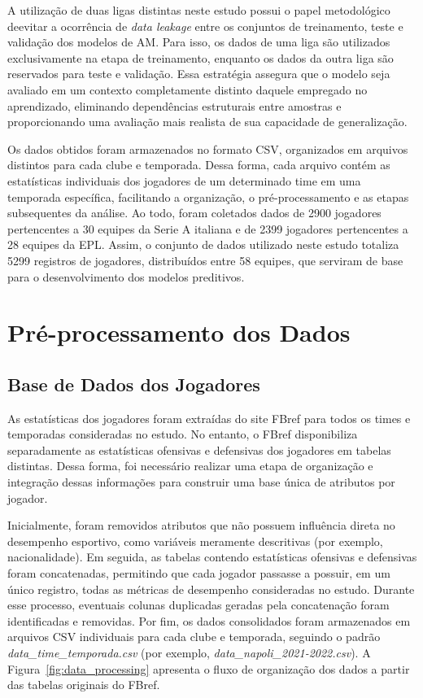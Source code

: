 A utilização de duas ligas distintas neste estudo possui o papel metodológico deevitar a ocorrência de \textit{data leakage} entre os conjuntos de 
treinamento, teste e validação dos modelos de AM. Para isso, os dados de uma liga são utilizados exclusivamente na etapa de treinamento, enquanto os 
dados da outra liga são reservados para teste e validação. Essa estratégia assegura que o modelo seja avaliado em um contexto completamente distinto daquele empregado no 
aprendizado, eliminando dependências estruturais entre amostras e proporcionando uma avaliação mais realista de sua capacidade de generalização.

Os dados obtidos foram armazenados no formato CSV, organizados em arquivos distintos para cada clube e temporada. Dessa forma, cada arquivo contém as estatísticas 
individuais dos jogadores de um determinado time em uma temporada específica, facilitando a organização, o pré-processamento e as etapas subsequentes da análise. 
Ao todo, foram coletados dados de 2900 jogadores pertencentes a 30 equipes da Serie A italiana e de 2399 jogadores pertencentes a 28 equipes da 
EPL. Assim, o conjunto de dados utilizado neste estudo totaliza 5299 registros de jogadores, distribuídos entre 58 equipes, 
que serviram de base para o desenvolvimento dos modelos preditivos.

\section{Pré-processamento dos Dados}

\subsection{Base de Dados dos Jogadores}

As estatísticas dos jogadores foram extraídas do site FBref \cite{fbref} para todos os times e temporadas consideradas no estudo. No entanto, 
o FBref disponibiliza separadamente as estatísticas ofensivas e defensivas dos jogadores em tabelas distintas. Dessa forma, foi necessário realizar uma etapa 
de organização e integração dessas informações para construir uma base única de atributos por jogador.

Inicialmente, foram removidos atributos que não possuem influência direta no desempenho esportivo, como variáveis meramente descritivas (por exemplo, nacionalidade). 
Em seguida, as tabelas contendo estatísticas ofensivas e defensivas foram concatenadas, permitindo que cada jogador passasse a possuir, em um único registro, todas 
as métricas de desempenho consideradas no estudo. Durante esse processo, eventuais colunas duplicadas geradas pela concatenação foram identificadas e removidas. 
Por fim, os dados consolidados foram armazenados em arquivos CSV individuais para cada clube e temporada, seguindo o padrão \textit{data\_time\_temporada.csv} 
(por exemplo, \textit{data\_napoli\_2021-2022.csv}). A Figura~\ref{fig:data_processing} apresenta o fluxo de organização dos dados a partir das tabelas originais do FBref.

